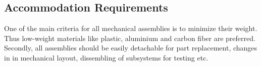 \subsection{Accommodation Requirements}
%
One of the main criteria for all mechanical assemblies is to minimize their weight. Thus low-weight materials like plastic, aluminium and carbon fiber are preferred. Secondly, all assemblies should be easily detachable for part replacement, changes in in mechanical layout, dissembling of subsystems for testing etc.
%
%
%
%
%
%
